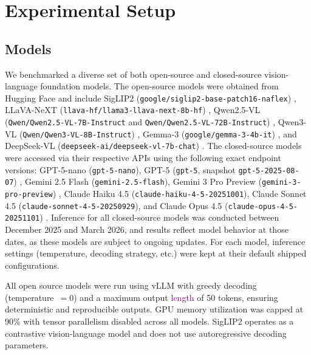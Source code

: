 \documentclass[10pt,letterpaper]{article}
\renewcommand{\hl}[1]{\textcolor{purple}{#1}}
\begin{document}
\section{Experimental Setup}
\label{sec:experiment}

\subsection{Models}

\parbox{\linewidth}{%
We benchmarked a diverse set of both open-source and closed-source vision-language foundation models. The open-source models were obtained from Hugging Face \cite{wolf_huggingfaces_2020} and include SigLIP2 (\texttt{google/siglip2-base-patch16-naflex}) \cite{tschannen_siglip_2025}, LLaVA-NeXT (\texttt{llava-hf/llama3-llava-next-8b-hf}) \cite{li_llava-next-interleave_2024}, Qwen2.5-VL (\texttt{Qwen/Qwen2.5-VL-7B-Instruct} and \texttt{Qwen/Qwen2.5-VL-72B-Instruct}) \cite{bai_qwen-vl_2023}, Qwen3-VL (\texttt{Qwen/Qwen3-VL-8B-Instruct}) \cite{bai_qwen3-vl_2025}, Gemma-3 (\texttt{google/gemma-3-4b-it}) \cite{team_gemma_2025}, and DeepSeek-VL (\texttt{deepseek-ai/deepseek-vl-7b-chat}) \cite{lu_deepseek-vl_2024}. The closed-source models were accessed via their respective APIs using the following exact endpoint versions: GPT-5-nano (\texttt{gpt-5-nano}), GPT-5 (\texttt{gpt-5}, snapshot \texttt{gpt-5-2025-08-07}) \cite{singh_openai_2025}, Gemini 2.5 Flash (\texttt{gemini-2.5-flash}), Gemini 3 Pro Preview (\texttt{gemini-3-pro-preview}) \cite{gemini2025}, Claude Haiku 4.5 (\texttt{claude-haiku-4-5-20251001}), Claude Sonnet 4.5 (\texttt{claude-sonnet-4-5-20250929}), and Claude Opus 4.5 (\texttt{claude-opus-4-5-20251101}) \cite{anthropic2025haiku}. Inference for all closed-source models was conducted between December 2025 and March 2026, and results reflect model behavior at those dates, as these models are subject to ongoing updates. For each model, inference settings (temperature, decoding strategy, etc.) were kept at their default shipped configurations.%
}%


All open source models were run using vLLM \cite{kwon2023efficient} with greedy decoding (temperature~$=0$) and a maximum output \hl{length} of 50 tokens, ensuring deterministic and reproducible outputs. GPU memory utilization was capped at 90\% with tensor parallelism disabled across all models. SigLIP2 operates as a contrastive vision-language model and does not use autoregressive decoding parameters.
\end{document}
